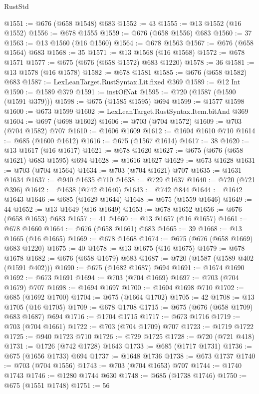 \begin{lexlean}{RustStd}
\begin{coremodule}
{\begin{coremodule}
{{{{{{{{{{{{@1551 := @676 (@658 @1548) @683
@1552 := 43
@1555 := @13 @1552 (@16 @1552)
@1556 := @678 @1555
@1559 := @676 (@658 @1556) @683
@1560 := 37
@1563 := @13 @1560 (@16 @1560)
@1564 := @678 @1563
@1567 := @676 (@658 @1564) @683
@1568 := 35
@1571 := @13 @1568 (@16 @1568)
@1572 := @678 @1571
@1577 := @675 (@676 (@658 @1572) @683 @1220)
@1578 := 36
@1581 := @13 @1578 (@16 @1578)
@1582 := @678 @1581
@1585 := @676 (@658 @1582) @683
@1587 := LexLeanTarget.RustSyntax.Lit.fixed @369
@1589 := @12 Int
@1590 := @1589 @379
@1591 := instOfNat
@1595 := @720 (@1587 (@1590 (@1591 @379)))
@1598 := @675 (@1585 @1595) @694
@1599 := @1577 @1598
@1600 := @673 @1599
@1602 := LexLeanTarget.RustSyntax.Item.bitAnd @369
@1604 := @697 (@698 @1602)
@1606 := @703 (@704 @1572)
@1609 := @703 (@704 @1582) @707
@1610 := @1606 @1609
@1612 := @1604 @1610 @710
@1614 := @685 (@1600 @1612)
@1616 := @675 (@1567 @1614)
@1617 := 38
@1620 := @13 @1617 (@16 @1617)
@1621 := @678 @1620
@1627 := @675 (@676 (@658 @1621) @683 @1595) @694
@1628 := @1616 @1627
@1629 := @673 @1628
@1631 := @703 (@704 @1564)
@1634 := @703 (@704 @1621) @707
@1635 := @1631 @1634
@1637 := @940 @1635 @710
@1638 := @729 @1637
@1640 := @720 (@721 @396)
@1642 := @1638 (@742 @1640)
@1643 := @742 @844
@1644 := @1642 @1643
@1646 := @685 (@1629 @1644)
@1648 := @675 (@1559 @1646)
@1649 := 44
@1652 := @13 @1649 (@16 @1649)
@1653 := @678 @1652
@1656 := @676 (@658 @1653) @683
@1657 := 41
@1660 := @13 @1657 (@16 @1657)
@1661 := @678 @1660
@1664 := @676 (@658 @1661) @683
@1665 := 39
@1668 := @13 @1665 (@16 @1665)
@1669 := @678 @1668
@1674 := @675 (@676 (@658 @1669) @683 @1220)
@1675 := 40
@1678 := @13 @1675 (@16 @1675)
@1679 := @678 @1678
@1682 := @676 (@658 @1679) @683
@1687 := @720 (@1587 (@1589 @402 (@1591 @402)))
@1690 := @675 (@1682 @1687) @694
@1691 := @1674 @1690
@1692 := @673 @1691
@1694 := @703 (@704 @1669)
@1697 := @703 (@704 @1679) @707
@1698 := @1694 @1697
@1700 := @1604 @1698 @710
@1702 := @685 (@1692 @1700)
@1704 := @675 (@1664 @1702)
@1705 := 42
@1708 := @13 @1705 (@16 @1705)
@1709 := @678 @1708
@1715 := @675 (@676 (@658 @1709) @683 @1687) @694
@1716 := @1704 @1715
@1717 := @673 @1716
@1719 := @703 (@704 @1661)
@1722 := @703 (@704 @1709) @707
@1723 := @1719 @1722
@1725 := @940 @1723 @710
@1726 := @729 @1725
@1728 := @720 (@721 @418)
@1731 := @1726 (@742 @1728) @1643
@1733 := @685 (@1717 @1731)
@1736 := @675 (@1656 @1733) @694
@1737 := @1648 @1736
@1738 := @673 @1737
@1740 := @703 (@704 @1556)
@1743 := @703 (@704 @1653) @707
@1744 := @1740 @1743
@1746 := @1280 @1744 @630
@1748 := @685 (@1738 @1746)
@1750 := @675 (@1551 @1748)
@1751 := 56
}}}}}}}}}}}}
\end{coremodule}}
\end{coremodule}
\end{lexlean}
